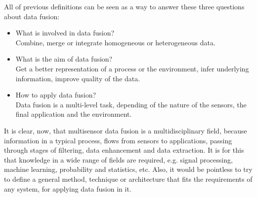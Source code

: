 




All of previous definitions can be seen as a way to answer these three questions about data fusion:
\begin{itemize}
	\item {What is involved in data fusion?\\Combine, merge or integrate homogeneous or heterogeneous data.}
	\item {What is the aim of data fusion?\\Get a better representation of a process or the environment, infer underlying information, improve quality of the data.}
	\item {How to apply data fusion?\\Data fusion is a multi-level task, depending of the nature of the sensors, the final application and the environment.}
\end{itemize}

It is clear, now, that multisensor data fusion is a multidisciplinary field, because information in a typical process, flows from sensors to applications, passing through stages of filtering, data enhancement and data extraction. It is for this that knowledge in a wide range of fields are required, e.g. signal processing, machine learning, probability and statistics, etc. Also, it would be pointless to try to define a general method, technique or architecture that fits the requirements of any system, for applying data fusion in it.


